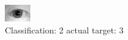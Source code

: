 \begin{figure}[h!]
\begin{center}
\includegraphics[width=0.60\columnwidth]{figures/ID1093_class_2_target_3.png}
\end{center}
\caption{ Classification: 2 actual target: 3}
\label{fig:ID1093_class_2_target_3}
\end{figure}

